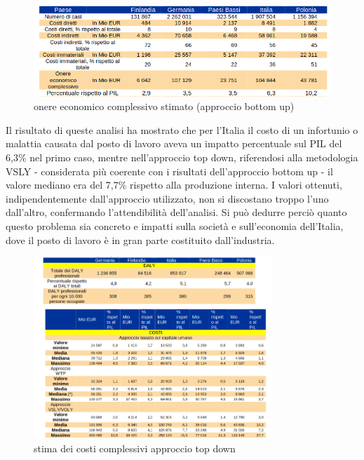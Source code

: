 \vspace{0,5cm}
\begin{figure}[htbp]
    \centering
    \includegraphics[width=\textwidth]{figures/onere_infortuni_ba.png}
    \caption{onere economico complessivo stimato (approccio bottom up)}
    \label{fig:osha_table1}
\end{figure}
\vspace{0,5cm} 

\noindent Il risultato di queste analisi ha mostrato che per l'Italia il costo di un infortunio o malattia causata dal posto di lavoro aveva un impatto percentuale sul PIL del 6,3\% nel primo caso, mentre nell'approccio top down, riferendosi alla metodologia VSLY - considerata più coerente con i risultati dell'approccio bottom up - il valore mediano era del 7,7\% rispetto alla produzione interna. I valori ottenuti, indipendentemente dall'approccio utilizzato, non si discostano troppo l'uno dall'altro, confermando l'attendibilità dell'analisi. Si può dedurre perciò quanto questo problema sia concreto e impatti sulla società e sull'economia dell'Italia, dove il posto di lavoro è in gran parte costituito dall'industria. 
 
\renewcommand{\floatpagefraction}{0.7} %
\begin{figure}[htbp]
    \centering
    \includegraphics[width=0.8\textwidth]{figures/onere_infortuni_td.png}
    \caption{stima dei costi complessivi approccio top down}
    \label{fig:osha_table2}
\end{figure} 

